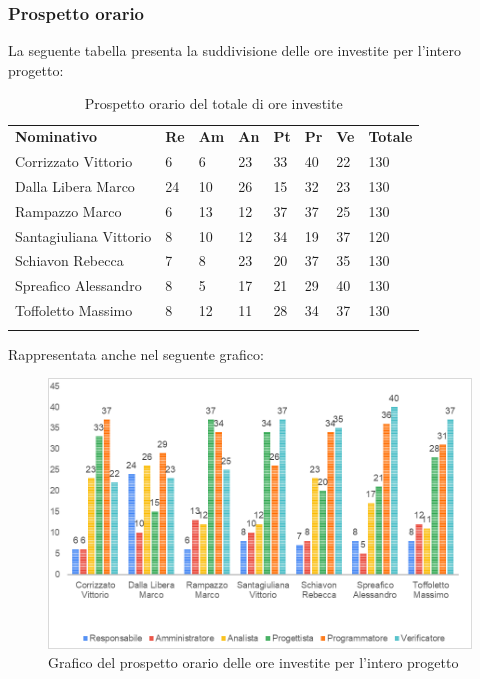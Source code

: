 \subsubsection{Prospetto orario}
La seguente tabella presenta la suddivisione delle ore investite per l'intero progetto\glo:
\begin{longtable} {				
		>{}p{40mm}  
		>{}p{8mm}
		>{}p{8mm}
		>{}p{8mm}
		>{}p{8mm}
		>{}p{8mm}
		>{}p{8mm}
		>{}p{12mm}			
	}			
	\rowcolor{gray!50}
	\textbf{Nominativo} & \textbf{Re} & \textbf{Am} & \textbf{An} & \textbf{Pt} & \textbf{Pr} & \textbf{Ve} & \textbf{Totale}	\TBstrut \\ [2mm]
	Corrizzato Vittorio & 6 & 6 & 23 & 33 & 40 & 22 & 130 \TBstrut \\ [2mm]
	Dalla Libera Marco & 24 & 10 & 26 & 15 & 32 & 23 & 130 \TBstrut \\ [2mm]
	Rampazzo Marco & 6 & 13 & 12 & 37 & 37 & 25 & 130 \TBstrut \\ [2mm]
	Santagiuliana Vittorio & 8 & 10 & 12 & 34 & 19 & 37 & 120 \TBstrut \\ [2mm]
	Schiavon Rebecca & 7 & 8 & 23 & 20 & 37 & 35 & 130 \TBstrut \\ [2mm]
	Spreafico Alessandro & 8 & 5 & 17 & 21 & 29 & 40 & 130 \TBstrut \\ [2mm]
	Toffoletto Massimo & 8 & 12 & 11 & 28 & 34 & 37 & 130 \TBstrut \\ [2mm]
	\rowcolor{white}
	\caption{Prospetto orario del totale di ore investite}
\end{longtable}
\pagebreak
Rappresentata anche nel seguente grafico:
\begin{figure} [H]
	\includegraphics[width=\linewidth]{./img/Grafici/9.png}
	\caption{Grafico del prospetto orario delle ore investite per l'intero progetto\glo}
\end{figure}

